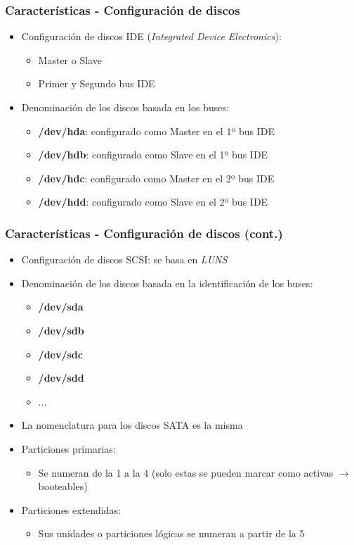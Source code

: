 \begin{frame}
  \frametitle{Características - Configuración de discos}
  \begin{itemize}
	  \item Configuración de discos IDE (\textit{Integrated Device Electronics}):
	  \begin{itemize}
	  	\item Master o Slave
	  	\item Primer y Segundo bus IDE
	  \end{itemize}
	  \item Denominación de los discos basada en los buses:
	  \begin{itemize}
	  	\item \textbf{/dev/hda}: configurado como Master en el 1º bus IDE
	  	\item \textbf{/dev/hdb}: configurado como Slave en el 1º bus IDE
	  	\item \textbf{/dev/hdc}: configurado como Master en el 2º bus IDE
	  	\item \textbf{/dev/hdd}: configurado como Slave en el 2º bus IDE
	  \end{itemize}
  \end{itemize}
\end{frame}

\begin{frame}
  \frametitle{Características - Configuración de discos (cont.)}
  \begin{itemize}
	  \item Configuración de discos SCSI: se basa en \textit{LUNS}
	  \item Denominación de los discos basada en la identificación de los buses:
	  \begin{itemize}
	  	\item \textbf{/dev/sda}
	  	\item \textbf{/dev/sdb}
	  	\item \textbf{/dev/sdc}
	  	\item \textbf{/dev/sdd}
	  	\item ...
	  \end{itemize}
	  \item La nomenclatura para los discos SATA es la misma
	  \item Particiones primarias:
	  \begin{itemize}
	  	\item Se numeran de la 1 a la 4 (solo estas se pueden marcar como activas $\rightarrow$ booteables)
	  \end{itemize}
	  \item Particiones extendidas:
	  \begin{itemize}
	  	\item Sus unidades o particiones lógicas se numeran a partir de la 5
	  \end{itemize}	  
  \end{itemize}
\end{frame}

